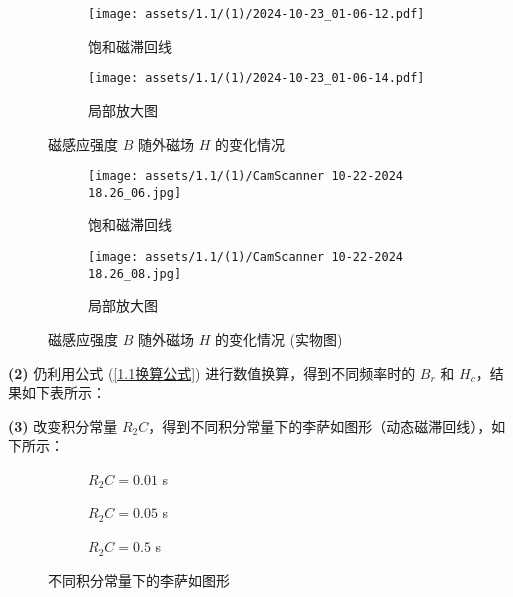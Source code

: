 \documentclass[UTF8]{article}
\theoremstyle{MyLineTheoremStyle} %
\theoremstyle{MyBlockTheoremStyle} %
\theoremstyle{MySubsubsectionStyle} %
\begin{document}
\begin{figure}[H]\centering
\begin{subfigure}[b]{0.5\columnwidth}\centering
    \texttt{[image: assets/1.1/(1)/2024-10-23\_01-06-12.pdf]}
    \caption{饱和磁滞回线}
\end{subfigure}\hfill
\begin{subfigure}[b]{0.5\columnwidth}\centering
    \texttt{[image: assets/1.1/(1)/2024-10-23\_01-06-14.pdf]}
    \caption{局部放大图}
\end{subfigure}
\caption{磁感应强度 $B$ 随外磁场 $H$ 的变化情况}
\label{1.1图}
\end{figure}
\begin{figure}[H]\centering
\begin{subfigure}[b]{0.5\columnwidth}\centering
    \texttt{[image: assets/1.1/(1)/CamScanner 10-22-2024 18.26\_06.jpg]}
    \caption{饱和磁滞回线}
\end{subfigure}\hfill
\begin{subfigure}[b]{0.5\columnwidth}\centering
    \texttt{[image: assets/1.1/(1)/CamScanner 10-22-2024 18.26\_08.jpg]}
    \caption{局部放大图}
\end{subfigure}
\caption{磁感应强度 $B$ 随外磁场 $H$ 的变化情况 (实物图)}\label{1.1照片}
\end{figure}

\noindent \textbf{(2)} 仍利用公式 (\ref{1.1换算公式}) 进行数值换算，得到不同频率时的 $B_r$ 和 $H_c$，结果如下表所示：


\noindent \textbf{(3)} 改变积分常量 $R_2 C$，得到不同积分常量下的李萨如图形（动态磁滞回线），如下所示：
\begin{figure}[H]\centering
\begin{subfigure}[b]{0.33\columnwidth}\centering
    \caption{$R_2C = 0.01$ s}
\end{subfigure}\hfill
\begin{subfigure}[b]{0.33\columnwidth}\centering
    \caption{$R_2C = 0.05$ s}
\end{subfigure}
\begin{subfigure}[b]{0.33\columnwidth}\centering
    \caption{$R_2C = 0.5$ s}
\end{subfigure}
\caption{不同积分常量下的李萨如图形}
\end{figure}
\end{document}
